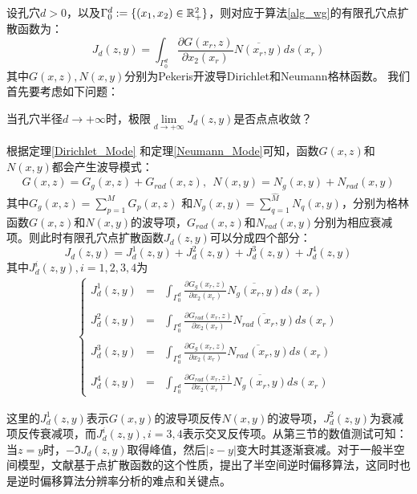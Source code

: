 设孔穴$d>0$，以及$\Gamma_0^d:=\{(x_1,x_2)\in\mathbb{R}^2_+\}$，则对应于算法\ref{alg_wg}的有限孔穴点扩散函数为：
\begin{equation}
 J_d(z,y)=\int_{\Gamma_0^d}\frac{\partial G(x_r,z)}{\partial x_2(x_r)}\overline{N(x_r,y)}ds(x_r)
\end{equation}
其中$G(x,z),N(x,y)$分别为Pekeris开波导Dirichlet和Neumann格林函数。
我们首先要考虑如下问题：
\begin{question}\label{pro_convergence}
当孔穴半径$d\rightarrow+\infty$时，极限$\lim\limits_{d\rightarrow+\infty}J_d(z,y)$是否点点收敛？
\end{question}
根据定理\ref{Dirichlet_Mode} 和定理\ref{Neumann_Mode}可知，函数$G(x,z)$和$N(x,y)$都会产生波导模式：
\begin{eqnarray*}
  G(x,z)=G_g(x,z)+G_{rad}(x,z),\ \
  N(x,y)=N_g(x,y)+N_{rad}(x,y)
\end{eqnarray*}
其中$G_g(x,z)=\sum\limits_{p=1}^MG_p(x,z)$ 和$N_g(x,y)=\sum\limits_{q=1}^{\hat M}N_q(x,y)$，分别为格林函数$G(x,z)$和$N(x,y)$的波导项，$G_{rad}(x,z)$和$N_{rad}(x,y)$分别为相应衰减项。则此时有限孔穴点扩散函数$J_d(z,y)$可以分成四个部分：
\begin{equation}
  J_d(z,y)=J_d^1(z,y)+J_d^2(z,y)+J_d^3(z,y)+J_d^4(z,y)
\end{equation}
其中$J_d^i(z,y),i=1,2,3,4$为
\begin{eqnarray}\label{psf_wg_4p}
 \left\{
 \begin{array}{lll}
  J_d^1(z,y)&=&\int_{\Gamma_0^d}\frac{\partial G_g(x_r,z)}{\partial x_2(x_r)}\overline{N_g(x_r,y)}ds(x_r)\\
  & &\\
  J_d^2(z,y)&=&\int_{\Gamma_0^d}\frac{\partial G_{rad}(x_r,z)}{\partial x_2(x_r)}\overline{N_{rad}(x_r,y)}ds(x_r)\\
  & &\\
  J_d^3(z,y)&=&\int_{\Gamma_0^d}\frac{\partial G_g(x_r,z)}{\partial x_2(x_r)}\overline{N_{rad}(x_r,y)}ds(x_r)\\
  & &\\
  J_d^4(z,y)&=&\int_{\Gamma_0^d}\frac{\partial G_{rad}(x_r,z)}{\partial x_2(x_r)}\overline{N_g(x_r,y)}ds(x_r)
 \end{array}
 \right.
\end{eqnarray}

这里的$J_d^1(z,y)$表示$G(x,y)$的波导项反传$N(x,y)$的波导项，$J_d^2(z,y)$为衰减项反传衰减项，而$J_d^i(z,y),i=3,4$表示交叉反传项。从第三节的数值测试可知：当$z=y$时，$-\Im J_d(z,y)$取得峰值，然后$|z-y|$变大时其逐渐衰减。对于一般半空间模型，文献\cite{ch_ha}基于点扩散函数的这个性质，提出了半空间逆时偏移算法，这同时也是逆时偏移算法分辨率分析的难点和关键点。


